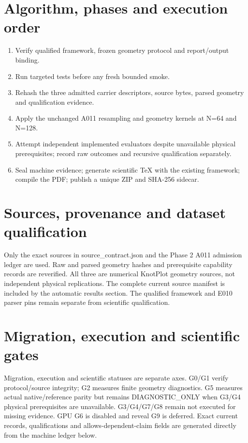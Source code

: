 \documentclass[10pt,a4paper]{article}
\begin{document}
\section{Algorithm, phases and execution order}
\begin{enumerate}\item Verify qualified framework, frozen geometry protocol and report/output binding.\item Run targeted tests before any fresh bounded smoke.\item Rehash the three admitted carrier descriptors, source bytes, parsed geometry and qualification evidence.\item Apply the unchanged A011 resampling and geometry kernels at N=64 and N=128.\item Attempt independent implemented evaluators despite unavailable physical prerequisites; record raw outcomes and recursive qualification separately.\item Seal machine evidence; generate scientific TeX with the existing framework; compile the PDF; publish a unique ZIP and SHA-256 sidecar.\end{enumerate}
\section{Sources, provenance and dataset qualification}
Only the exact sources in source\_contract.json and the Phase 2 A011 admission ledger are used. Raw and parsed geometry hashes and prerequisite capability records are reverified. All three are numerical KnotPlot geometry sources, not independent physical replications. The complete current source manifest is included by the automatic results section. The qualified framework and E010 parser pins remain separate from scientific qualification.
\section{Migration, execution and scientific gates}
Migration, execution and scientific statuses are separate axes. G0/G1 verify protocol/source integrity; G2 measures finite geometry diagnostics. G5 measures actual native/reference parity but remains DIAGNOSTIC\_ONLY when G3/G4 physical prerequisites are unavailable. G3/G4/G7/G8 remain not executed for missing evidence. GPU G6 is disabled and reveal G9 is deferred. Exact current records, qualifications and allows-dependent-claim fields are generated directly from the machine ledger below.
\end{document}
